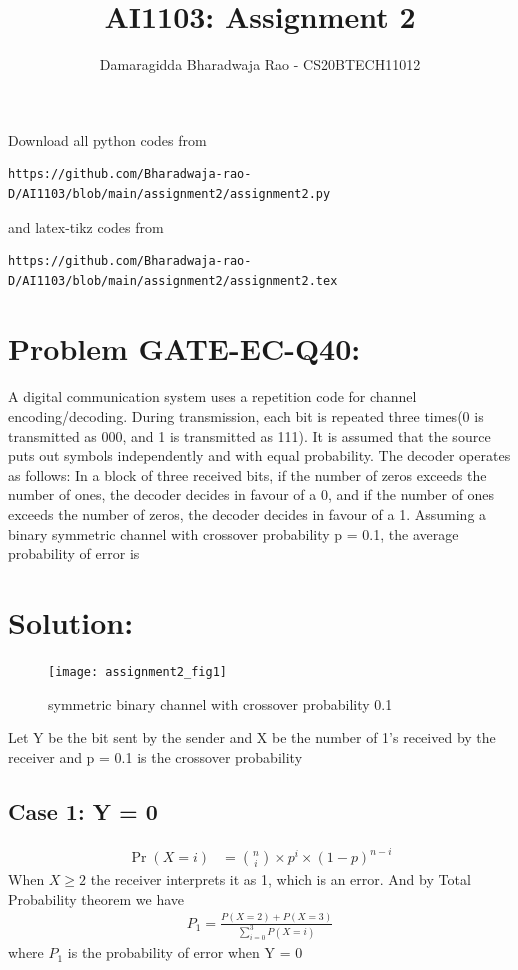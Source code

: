 \documentclass[journal,12pt,twocolumn]{IEEEtran}
\begin{document}
     \def\rightbox#1{\makebox[0in][r]{#1}}
     \def\centbox#1{\makebox[0in]{#1}}
     \def\topbox#1{\raisebox{-\baselineskip}[0in][0in]{#1}}
     \def\midbox#1{\raisebox{-0.5\baselineskip}[0in][0in]{#1}}
\vspace{3cm}
\title{AI1103: Assignment 2}
\author{Damaragidda Bharadwaja Rao - CS20BTECH11012}
\maketitle
\newpage
\bigskip
\renewcommand{\thefigure}{\theenumi}
\renewcommand{\thetable}{\theenumi}
Download all python codes from 
\begin{lstlisting}
https://github.com/Bharadwaja-rao-D/AI1103/blob/main/assignment2/assignment2.py
\end{lstlisting}
%
and latex-tikz codes from 
%
\begin{lstlisting}
https://github.com/Bharadwaja-rao-D/AI1103/blob/main/assignment2/assignment2.tex
\end{lstlisting}
\section*{Problem GATE-EC-Q40: }
A digital communication system uses a
repetition code for channel
encoding/decoding. During transmission, each
bit is repeated three times(0 is transmitted as
000, and 1 is transmitted as 111). It is
assumed that the source puts out symbols
independently and with equal probability. The
decoder operates as follows: In a block of three
received bits, if the number of zeros exceeds the
number of ones, the decoder decides in favour of
a 0, and if the number of ones exceeds the
number of zeros, the decoder decides in favour
of a 1. Assuming a binary symmetric channel
with crossover probability p = 0.1, the average
probability of error is
\section*{Solution:}
\begin{figure}[H]
    \centering
    \texttt{[image: assignment2\_fig1]}
    \caption{symmetric binary channel with crossover probability 0.1}
    \label{fig:1}
\end{figure}
Let Y be the bit sent by the sender and X be the number of 1's received by the receiver and p = 0.1 is the crossover probability
\subsection*{Case 1: Y = 0}
\begin{align}
    \Pr(X = i) &= \binom{n}{i}\times p^i\times (1-p)^{n-i}
\end{align}
When $X \geq 2 $ the receiver interprets it as 1, which is an error. And by Total Probability theorem we have\\
\begin{align}
P_1 = \frac{P(X = 2) + P(X = 3)}{\sum_{i=0}^3P(X = i)}
\end{align}
where $P_1$ is the probability of error when Y = 0
\end{document}
